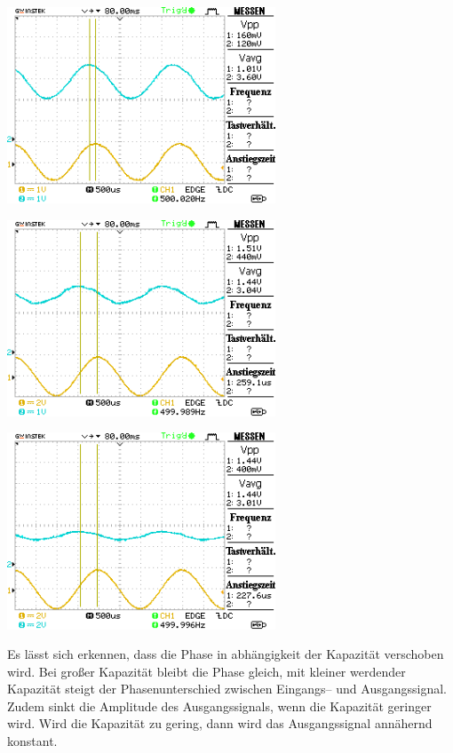 \documentclass[10pt]{article}
\newenvironment{Figure}
  {\par\medskip\noindent\minipage{\linewidth}}
  {\endminipage\par\medskip}
\begin{document}
\begin{multicols}{2}
\begin{Figure}
	\end{Figure}
	\begin{Figure}
		\centering
		\includegraphics[width=0.6\textwidth]{../data/DS0007.png}
	\end{Figure}
	\begin{Figure}
		\centering
		\includegraphics[width=0.6\textwidth]{../data/DS0008.png}
	\end{Figure}
	\begin{Figure}
		\centering
		\includegraphics[width=0.6\textwidth]{../data/DS0009.png}
	\end{Figure}
	Es lässt sich erkennen, dass die Phase in abhängigkeit der Kapazität verschoben wird.
	Bei großer Kapazität bleibt die Phase gleich, mit kleiner werdender Kapazität steigt der Phasenunterschied zwischen Eingangs-- und Ausgangssignal.
	Zudem sinkt die Amplitude des Ausgangssignals, wenn die Kapazität geringer wird.
	Wird die Kapazität zu gering, dann wird das Ausgangssignal annähernd konstant.


\end{multicols}
\end{document}
